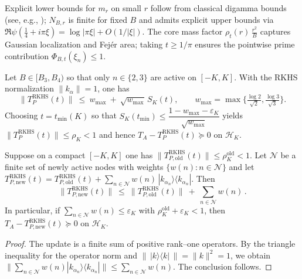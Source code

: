 \begin{remark}
Explicit lower bounds for $m_r$ on small $r$ follow from classical digamma bounds (see, e.g., \cite[\S5]{NISTDLMF}); $N_{B,r}$ is finite for fixed $B$ and admits explicit upper bounds via $\Re\psi(\tfrac14+i\pi\xi)=\log|\pi\xi|+O(1/|\xi|)$. The core mass factor $\rho_t(r)\,\tfrac{r^2}{B}$ captures Gaussian localization and Fej\'er area; taking $t\ge 1/\pi$ ensures the pointwise prime contribution $\Phi_{B,t}(\xi_n)\le1$.
\end{remark}

\begin{theorem}\label{md:thm:MD23-operator}
Let $B\in[B_3,B_4)$ so that only $n\in\{2,3\}$ are active on $[-K,K]$. With the RKHS normalization $\|k_{\alpha}\|=1$, one has
\begin{equation}\label{eq:MD_2_3_base_interval-formula-1}
\|T_P^{\mathrm{RKHS}}(t)\|\ \le\ w_{\max}\ +\ \sqrt{w_{\max}}\,S_K(t),\qquad w_{\max}=\max\Big\{\tfrac{\log 2}{\sqrt2},\tfrac{\log 3}{\sqrt3}\Big\}.
\end{equation}
Choosing $t=t_{\min}(K)$ so that $S_K(t_{\min})\le \dfrac{1-w_{\max}-\varepsilon_K}{\sqrt{w_{\max}}}$ yields $\|T_P^{\mathrm{RKHS}}(t)\|\le \rho_K<1$ and hence $T_A-T_P^{\mathrm{RKHS}}(t)\succeq0$ on $\mathcal H_K$.
\end{theorem}

\begin{theorem}\label{md:thm:ind-block}
Suppose on a compact $[-K,K]$ one has $\|T_{P,\mathrm{old}}^{\mathrm{RKHS}}(t)\|\le \rho_K^{\mathrm{old}}<1$. Let $\mathcal N$ be a finite set of newly active nodes with weights $\{w(n): n\in\mathcal N\}$ and let $T_{P,\mathrm{new}}^{\mathrm{RKHS}}(t)=T_{P,\mathrm{old}}^{\mathrm{RKHS}}(t)+\sum_{n\in\mathcal N} w(n)\,|k_{\alpha_n}\rangle\!\langle k_{\alpha_n}|$. Then
\begin{equation}\label{eq:MD_2_3_base_interval-formula-6}
 \|T_{P,\mathrm{new}}^{\mathrm{RKHS}}(t)\|\ \le\ \|T_{P,\mathrm{old}}^{\mathrm{RKHS}}(t)\|\ +\ \sum_{n\in\mathcal N} w(n)\,.
\end{equation}
In particular, if $\sum_{n\in\mathcal N} w(n)\le \varepsilon_K$ with $\rho_K^{\mathrm{old}}+\varepsilon_K<1$, then $T_A-T_{P,\mathrm{new}}^{\mathrm{RKHS}}(t)\succeq 0$ on $\mathcal H_K$.
\end{theorem}
\begin{proof}
The update is a finite sum of positive rank--one operators. By the triangle inequality for the operator norm and $\|\,|k\rangle\!\langle k|\,\|=\|k\|^2=1$, we obtain
\(\|\sum_{n\in\mathcal N} w(n)|k_{\alpha_n}\rangle\!\langle k_{\alpha_n}|\|\le \sum_{n\in\mathcal N} w(n).\)
The conclusion follows.
\end{proof}

